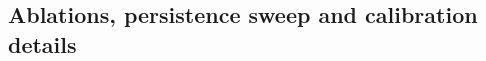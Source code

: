 \documentclass[pdflatex,sn-mathphys-num]{sn-jnl}
\begin{document}
\begin{appendices}
\section{Ablations, persistence sweep and calibration details}\label{app:details}






\end{appendices}


\end{document}
